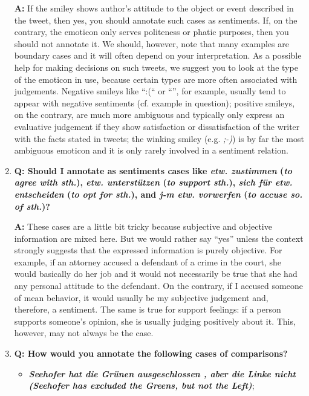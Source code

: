 \documentclass[11pt,a4paper]{article}
\theoremstyle{mytheoremstyle}
\begin{document}
\begin{enumerate}
\textbf{A:} If the smiley shows author's attitude to the object or
event described in the tweet, then yes, you should annotate such cases
as sentiments.  If, on the contrary, the emoticon only serves
politeness or phatic purposes, then you should not annotate it.  We
should, however, note that many examples are boundary cases and it
will often depend on your interpretation.  As a possible help for
making decisions on such tweets, we suggest you to look at the type of
the emoticon in use, because certain types are more often associated
with judgements.  Negative smileys like ``:(`` or ``\frownie{}'', for
example, usually tend to appear with negative sentiments (cf. example
in question); positive smileys, on the contrary, are much more
ambiguous and typically only express an evaluative judgement if they
show satisfaction or dissatisfaction of the writer with the facts
stated in tweets; the winking smiley (e.g. \textit{;-)}) is by far the
most ambiguous emoticon and it is only rarely involved in a sentiment
relation.

\item\textbf{Q: Should I annotate as sentiments cases like
  \textit{etw. zustimmen} (\textit{to agree with sth.}), \textit{etw.
    unterst\"utzen} (\textit{to support sth.}), \textit{sich f\"ur
    etw. entscheiden} (\textit{to opt for sth.}), and \textit{j-m
    etw. vorwerfen} (\textit{to accuse so. of sth.})?}

  \textbf{A:} These cases are a little bit tricky because subjective
  and objective information are mixed here.  But we would rather say
  ``yes'' unless the context strongly suggests that the expressed
  information is purely objective.  For example, if an attorney
  accused a defendant of a crime in the court, she would basically do
  her job and it would not necessarily be true that she had any
  personal attitude to the defendant.  On the contrary, if I accused
  someone of mean behavior, it would usually be my subjective
  judgement and, therefore, a sentiment.  The same is true for support
  feelings: if a person supports someone's opinion, she is usually
  judging positively about it.  This, however, may not always be the
  case.

\item\textbf{Q: How would you annotate the following cases of comparisons?}
  \begin{itemize}
  \item\textbf{\textit{Seehofer hat die Gr\"unen ausgeschlossen , aber
      die Linke nicht (Seehofer has excluded the Greens, but not the
      Left)}};


\end{itemize}
\end{enumerate}
\end{document}
